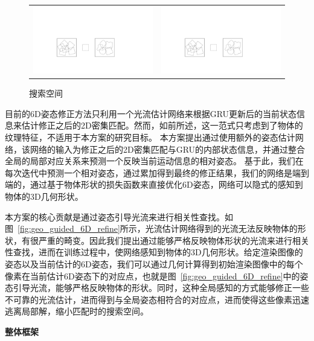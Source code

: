 \documentclass[12pt]{article}
\begin{document}
\begin{figure}
    \centering
    \begin{tabular}{cc}
        \includegraphics[width=0.4\linewidth]{figures/shape_unaware_v3.pdf} & 
        \includegraphics[width=0.4\linewidth]{figures/shape_aware_v3.pdf}  \\
    \end{tabular}
    \caption{搜索空间}
    \label{fig:search_space}
\end{figure}


目前的6D姿态修正方法只利用一个光流估计网络来根据GRU更新后的当前状态信息来估计修正之后的2D密集匹配。然而，如前所述，这一范式只考虑到了物体的纹理特征，不适用于本方案的研究目标。
本方案提出通过使用额外的姿态估计网络，该网络的输入为修正之后的2D密集匹配与GRU的内部状态信息，并通过整合全局的局部对应关系来预测一个反映当前运动信息的相对姿态。
基于此，我们在每次迭代中预测一个相对姿态，通过累加得到最终的修正结果，我们的网络是端到端的，通过基于物体形状的损失函数来直接优化6D姿态，网络可以隐式的感知到物体的3D几何形状。


本方案的核心贡献是通过姿态引导光流来进行相关性查找。如图~\ref{fig:geo_guided_6D_refine}所示，光流估计网络得到的光流无法反映物体的形状，有很严重的畸变。因此我们提出通过能够严格反映物体形状的光流来进行相关性查找，进而在训练过程中，使网络感知到物体的3D几何形状。给定渲染图像的姿态以及当前估计的6D姿态，我们可以通过几何计算得到初始渲染图像中的每个像素在当前估计6D姿态下的对应点，也就是图~\ref{fig:geo_guided_6D_refine}中的姿态引导光流，能够严格反映物体的形状。同时，这种全局感知的方式能够修正一些不可靠的光流估计，进而得到与全局姿态相符合的对应点，进而使得这些像素迅速逃离局部解，缩小匹配时的搜索空间。

\textbf{整体框架}
\end{document}
